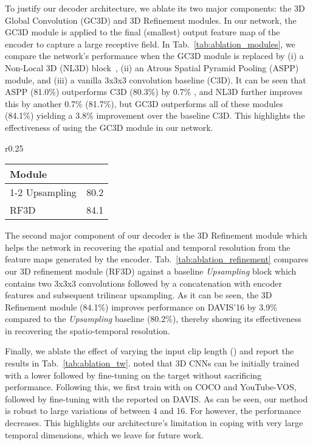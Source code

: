 \documentclass{bmvc2k}
\newcommand{\PAR}[1]{\vskip4pt \noindent {\bf #1~}}
\begin{document}
\PAR{Decoder:} To justify our decoder architecture, we ablate its two major components: the 3D Global Convolution (GC3D) and 3D Refinement modules.  
In our network, the GC3D module is applied to the final (smallest) output feature map of the encoder to capture a large receptive field. 
In Tab.~\ref{tab:ablation_modules}, we compare the network's performance when the GC3D module is replaced by (i) a Non-Local 3D (NL3D) block~\cite{Wang17CVPR}, (ii) an Atrous Spatial Pyramid Pooling (ASPP) module, and (iii) a vanilla 3x3x3 convolution baseline (C3D). It can be seen that ASPP (81.0\%) outperforms C3D (80.3\%) by 0.7\% , and NL3D further improves this by another 0.7\% (81.7\%), but GC3D outperforms all of these modules (84.1\%) yielding a 3.8\% improvement over the baseline C3D. This highlights the effectiveness of using the GC3D module in our network.

\begin{wraptable}{r}{0.25\textwidth}
\setlength{\tabcolsep}{5px}\footnotesize
\vspace{-19pt}\begin{tabular}[t]{l | c} \toprule
            Module &  \\
\cmidrule(lr){1-2}
                Upsampling &80.2 \\
                RF3D  &  84.1\\
\bottomrule
            \end{tabular}
\caption{Analysis of different decoder modules on DAVIS'16.}
\vspace{-8px}
\label{tab:ablation_refinement}
\end{wraptable} 
The second major component of our decoder is the 3D Refinement module which helps the network in recovering the spatial and temporal resolution from the feature maps generated by the encoder. Tab.~\ref{tab:ablation_refinement} compares our 3D refinement module (RF3D) against a baseline \textit{Upsampling} block which contains two 3x3x3 convolutions followed by a concatenation with encoder features and subsequent trilinear upsampling. As it can be seen, the 3D Refinement module (84.1\%) improves performance on DAVIS'16 by 3.9\%  compared to the \textit{Upsampling} baseline (80.2\%), thereby showing its effectiveness in recovering the spatio-temporal resolution. 


\PAR{Input Clip Length:} Finally, we ablate the effect of varying the input clip length () and report the results in Tab.~\ref{tab:ablation_tw}. \cite{Tran18CVPR} noted that 3D CNNs can be initially trained with a lower  followed by fine-tuning on the target  without sacrificing performance. Following this, we first train with  on COCO and YouTube-VOS, followed by fine-tuning with the reported  on DAVIS. 
As can be seen, our method is robust to large variations of  between 4 and 16. For  however, the performance decreases. This highlights our architecture's limitation in coping with very large temporal dimensions, which we leave for future work.
\end{document}
